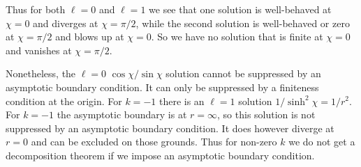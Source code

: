 \documentclass[10pt,letterpaper]{article}
\numberwithin{equation}{section}
\begin{document}
Thus for both $\ell=0$ and $\ell=1$ we see that one solution is well-behaved at $\chi=0$ and diverges at $\chi=\pi/2$, while the second solution is well-behaved or zero at $\chi=\pi/2$ and blows up at $\chi=0$. So we have no solution that is finite at $\chi=0$ and vanishes at $\chi=\pi/2$.

Nonetheless, the $\ell=0$ $\cos\chi/\sin\chi$ solution cannot be suppressed by an asymptotic boundary condition. It can only be suppressed by a finiteness condition at the origin. For $k=-1$ there is an $\ell=1$ solution $1/\sinh^2\chi=1/r^2$. For $k=-1$ the asymptotic boundary is at $r=\infty$, so this solution is not suppressed by an asymptotic boundary condition. It does however diverge at $r=0$ and can be excluded on those grounds. Thus for non-zero $k$ we do not get a decomposition theorem if we impose an asymptotic boundary condition.
\end{document}
